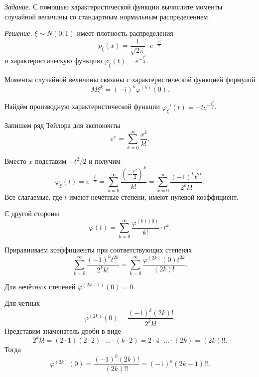 \textit{Задание.}
С помощью характеристической функции вычислите моменты случайной величины со стандартным нормальным
распределением.

\textit{Решение.} $ \xi \sim N \left( 0, 1 \right) $ имеет плотность распределения
$$p_{ \xi } \left( x \right) =
\frac{1}{ \sqrt{2 \pi }} \cdot e^{- \frac{x^2}{2}}$$
и характеристическую функцию $ \varphi_{ \xi } \left( t \right) = e^{- \frac{t^2}{2}}$.

Моменты случайной величины связаны с характеристической функцией формулой
\begin{equation}\label{eq:connection}
  M \xi^k =
\left( -i \right)^k \varphi^{ \left( k \right) } \left( 0 \right).
\end{equation}

Найдём производную характеристической функции
$ \varphi_{ \xi }' \left( t \right) =
  -te^{- \frac{t^2}{2}}$.

Запишем ряд Тейлора для экспоненты
$$e^x =
  \sum \limits_{k = 0}^{ \infty } \frac{x^k}{k!}.$$

Вместо $x$ подставим $-t^2 / 2$ и получим
$$ \varphi_{ \xi } \left( t \right) =
  e^{- \frac{t^2}{2}} =
  \sum \limits_{k = 0}^{ \infty } \frac{ \left( - \frac{t^2}{2} \right)^k}{k!} =
  \sum \limits_{k = 0}^{ \infty } \frac{ \left( -1 \right)^k t^{2k}}{2^k k!}.$$
Все слагаемые, где $t$ имеют нечётные степени, имеют нулевой коэффициент.

С другой стороны
$$ \varphi \left( t \right) =
  \sum \limits_{k = 0}^{ \infty }
    \frac{ \varphi^{ \left( k \right) \left( 0 \right) }}{k!} \cdot t^k.$$

Приравниваем коэффициенты при соответствующих степенях
$$ \sum \limits_{k = 0}^{ \infty } \frac{ \left( -1 \right)^k t^{2k}}{2^k k!} =
  \sum \limits_{k = 0}^{ \infty }
    \frac{ \varphi^{ \left( 2k \right) } \left( 0 \right) t^{2k}}{ \left( 2k \right)!}.$$

Для нечётных степеней $ \varphi^{ \left( 2k - 1 \right) } \left( 0 \right) = 0$.

Для четных ---
$$ \varphi^{ \left( 2k \right) } \left( 0 \right) =
  \frac{ \left( -1 \right)^k \left( 2k \right)!}{2^k k!}.$$
Представим знаменатель дроби в виде
$$2^k k! =
  \left( 2 \cdot 1 \right) \left( 2 \cdot 2 \right) \cdot \dotsc \cdot \left( k \cdot 2 \right) =
  2 \cdot 4 \cdot \dotsc \cdot \left( 2k \right) =
  \left( 2k \right)!!.$$
Тогда
$$ \varphi^{ \left( 2k \right) } \left( 0 \right) =
  \frac{ \left( -1 \right)^k \left( 2k \right)!}{ \left( 2k \right)!!} =
  \left( -1 \right)^k \left( 2k - 1 \right)!!.$$

